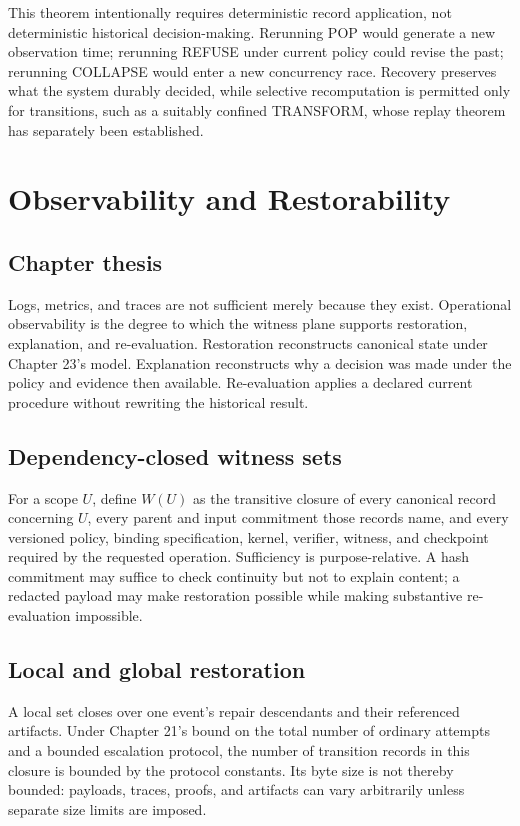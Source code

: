 \documentclass[11pt,openany]{book}
\begin{document}
This theorem intentionally requires deterministic record application, not
deterministic historical decision-making. Rerunning POP would generate a new
observation time; rerunning REFUSE under current policy could revise the past;
rerunning COLLAPSE would enter a new concurrency race. Recovery preserves what
the system durably decided, while selective recomputation is permitted only
for transitions, such as a suitably confined TRANSFORM, whose replay theorem
has separately been established.

\chapter{Observability and Restorability}
\section{Chapter thesis}
Logs, metrics, and traces are not sufficient merely because they exist.
Operational observability is the degree to which the witness plane supports
restoration, explanation, and re-evaluation. Restoration reconstructs canonical
state under Chapter 23's model. Explanation reconstructs why a decision was
made under the policy and evidence then available. Re-evaluation applies a
declared current procedure without rewriting the historical result.

\section{Dependency-closed witness sets}
For a scope \(U\), define \(W(U)\) as the transitive closure of every canonical
record concerning \(U\), every parent and input commitment those records name,
and every versioned policy, binding specification, kernel, verifier, witness,
and checkpoint required by the requested operation. Sufficiency is
purpose-relative. A hash commitment may suffice to check continuity but not to
explain content; a redacted payload may make restoration possible while making
substantive re-evaluation impossible.

\section{Local and global restoration}
A local set closes over one event's repair descendants and their referenced
artifacts. Under Chapter 21's bound on the total number of ordinary attempts
and a bounded escalation protocol, the number of transition records in this
closure is bounded by the protocol constants. Its byte size is not thereby
bounded: payloads, traces, proofs, and artifacts can vary arbitrarily unless
separate size limits are imposed.
\end{document}
